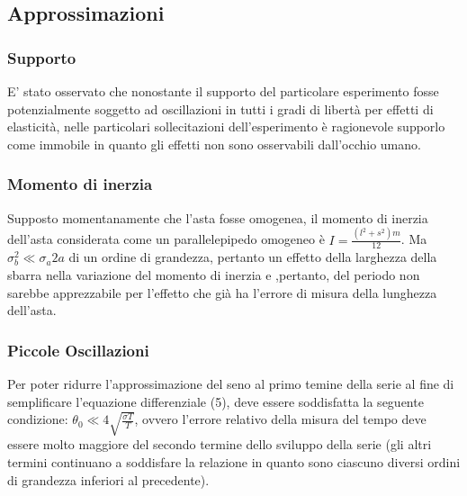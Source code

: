 \documentclass[11pt]{article}
\begin{document}
\subsection{Approssimazioni}
\subsubsection{Supporto}
E' stato osservato che nonostante il supporto del particolare esperimento fosse potenzialmente soggetto ad oscillazioni in tutti i gradi di libertà per effetti di elasticità, nelle particolari sollecitazioni dell'esperimento è ragionevole supporlo come immobile in quanto gli effetti non sono osservabili dall'occhio umano.
\subsubsection{Momento di inerzia}
Supposto momentanamente che l'asta fosse omogenea, il momento di inerzia dell'asta considerata come un parallelepipedo omogeneo è $I=\frac{(l^2+s^2)m}{12}$.
Ma $\sigma_b ^2 \ll \sigma_a 2a$ di un ordine di grandezza, pertanto un effetto della larghezza della sbarra nella variazione del momento di inerzia e ,pertanto, del periodo non sarebbe apprezzabile per l'effetto che già ha l'errore di misura della lunghezza dell'asta.
\subsubsection{Piccole Oscillazioni}
Per poter ridurre l'approssimazione del seno al primo temine della serie al fine di semplificare l'equazione differenziale (5), deve essere soddisfatta la seguente condizione: $\theta_0 \ll 4\sqrt{\frac{\sigma T}{T}}$, ovvero l'errore relativo della misura del tempo deve essere molto maggiore del secondo termine dello sviluppo della serie (gli altri termini continuano a soddisfare la relazione in quanto sono ciascuno diversi ordini di grandezza inferiori al precedente).
\end{document}
